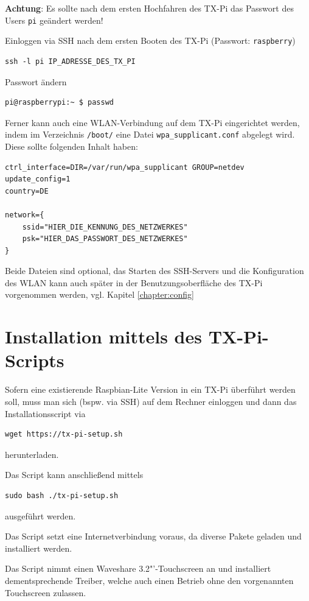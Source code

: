 \documentclass[
  paper=A4,
  ngerman,
  fontsize=12pt,
  parskip=half-,
]{scrbook}
\begin{document}
\textbf{Achtung}: Es sollte nach dem ersten Hochfahren des TX-Pi
das Passwort des Users \texttt{pi} geändert werden!

Einloggen via SSH nach dem ersten Booten des TX-Pi (Passwort: \texttt{raspberry})
\begin{lstlisting}
ssh -l pi IP_ADRESSE_DES_TX_PI
\end{lstlisting}

Passwort ändern
\begin{lstlisting}
pi@raspberrypi:~ $ passwd
\end{lstlisting}

Ferner kann auch eine WLAN-Verbindung auf dem TX-Pi eingerichtet 
werden, indem im Verzeichnis \texttt{/boot/} eine Datei 
\texttt{wpa\_supplicant.conf} abgelegt wird. 
Diese sollte folgenden Inhalt haben:
\begin{lstlisting}
ctrl_interface=DIR=/var/run/wpa_supplicant GROUP=netdev
update_config=1
country=DE

network={
    ssid="HIER_DIE_KENNUNG_DES_NETZWERKES"
    psk="HIER_DAS_PASSWORT_DES_NETZWERKES"
}
\end{lstlisting}

Beide Dateien sind optional, das Starten des SSH-Servers und
die Konfiguration des WLAN kann auch später in der Benutzungsoberfläche
des TX-Pi vorgenommen werden, vgl. Kapitel \ref{chapter:config}


\section{Installation mittels des TX-Pi-Scripts}

Sofern eine existierende Raspbian-Lite Version in ein TX-Pi
überführt werden soll, muss man sich (bspw. via SSH) auf dem 
Rechner einloggen und dann das Installationsscript via
\begin{lstlisting}
wget https://tx-pi-setup.sh
\end{lstlisting}
herunterladen.

Das Script kann anschließend mittels
\begin{lstlisting}
sudo bash ./tx-pi-setup.sh
\end{lstlisting}
ausgeführt werden.

Das Script setzt eine Internetverbindung voraus, da diverse Pakete geladen und
installiert werden.

Das Script nimmt einen Waveshare 3.2"'-Touchscreen an und installiert
dementsprechende Treiber, welche auch einen Betrieb ohne den vorgenannten
Touchscreen zulassen.
\end{document}
